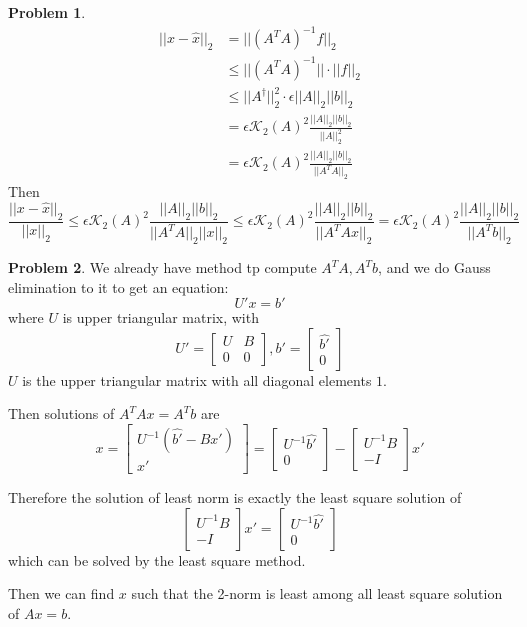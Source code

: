 \documentclass[a4paper]{article}
\theoremstyle{definition}
\newtheorem{problem}{Problem}
\theoremstyle{plain}
\newcommand{\dps}{\displaystyle}
\numberwithin{equation}{problem}
\begin{document}
\begin{problem}
    \begin{align*}
        ||x-\hat{x}||_2&=||(A^TA)^{-1}f||_2\\
        & \leq ||(A^TA)^{-1}||\cdot||f||_2\\
        & \leq ||A^\dagger||_2^2\cdot\epsilon ||A||_2||b||_2\\
        &=\epsilon\mathcal{K}_2(A)^2\dps\frac{||A||_2||b||_2}{||A||_2^2}\\
        &=\epsilon\mathcal{K}_2(A)^2 \frac{||A||_2||b||_2}{||A^TA||_2}
    \end{align*}
    Then\[\dps\frac{||x-\hat{x}||_2}{||x||_2} \leq\epsilon\mathcal{K}_2(A)^2 \frac{||A||_2||b||_2}{||A^TA||_2||x||_2} \leq \epsilon\mathcal{K}_2(A)^2 \frac{||A||_2||b||_2}{||A^TAx||_2}=\epsilon\mathcal{K}_2(A)^2 \frac{||A||_2||b||_2}{||A^Tb||_2}\]
\end{problem}

\begin{problem}
    We already have method tp compute  $ A^TA,A^Tb $, and we do Gauss elimination to it to get an equation:
    \[U'x=b'\]
    where  $ U $ is upper triangular matrix, with 
    \[
        U'=\begin{bmatrix}
            U & B\\
            0 & 0
        \end{bmatrix},
        b'=\begin{bmatrix}
            \hat{b'}\\
            0
        \end{bmatrix}
    \] 
     $ U $ is the upper triangular matrix with all diagonal elements $ 1 $.
     
     Then solutions of  $ A^TAx=A^Tb $ are
     \[x=\begin{bmatrix}
        U^{-1}(\hat{b'}-Bx')\\
        x'
     \end{bmatrix}=\begin{bmatrix}
        U^{-1}\hat{b'}\\
        0
     \end{bmatrix}-\begin{bmatrix}
        U^{-1}B\\
        -I
     \end{bmatrix}x'
     \]
     
     Therefore the solution of least norm is exactly the least square solution of 
     \[
        \begin{bmatrix}
            U^{-1}B\\
            -I
         \end{bmatrix}x'=\begin{bmatrix}
            U^{-1}\hat{b'}\\
            0
         \end{bmatrix}
     \] 
     which can be solved by the least square method.

     Then we can find  $ x $ such that the 2-norm is least among all least square solution of  $ Ax=b $. 
\end{problem}
\end{document}
